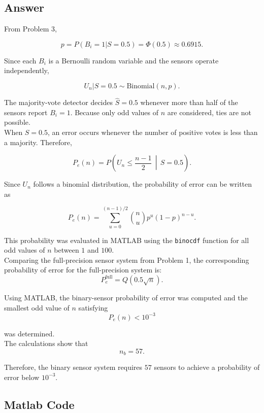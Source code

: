 \documentclass[12pt,a4paper]{article}
\begin{document}
\subsection{Answer}

From Problem 3,

\[
p=P(B_i=1|S=0.5)
=
\Phi(0.5)
\approx 0.6915.
\]

Since each \(B_i\) is a Bernoulli random variable and the sensors operate independently,

\[
U_n|S=0.5
\sim
\text{Binomial}(n,p).
\]

The majority-vote detector decides \(\hat{S}=0.5\) whenever more than half of the sensors report \(B_i=1\). Because only odd values of $n$ are considered, ties are not possible.\\

When \(S=0.5\), an error occurs whenever the number of positive votes is less than a majority. Therefore,

\[
P_e(n)
=
P\!\left(
U_n\leq \frac{n-1}{2}
\,\middle|\,
S=0.5
\right).
\]

Since \(U_n\) follows a binomial distribution, the probability of error can be written as

\[
P_e(n)
=
\sum_{u=0}^{(n-1)/2}
\binom{n}{u}
p^u
(1-p)^{n-u}.
\]

This probability was evaluated in MATLAB using the \texttt{binocdf} function for all odd values of \(n\) between \(1\) and \(100\).\\

Comparing the full-precision sensor system from Problem 1, the corresponding probability of error for the full-precision system is:
\[
P_e^{\text{full}}
=
Q(0.5\sqrt{n}).
\]

Using MATLAB, the binary-sensor probability of error was computed and the smallest odd value of \(n\) satisfying
\[
P_e(n)<10^{-3}
\]

was determined.\\

The calculations show that
\[
\boxed{n_b=57}.
\]

Therefore, the binary sensor system requires \(57\) sensors to achieve a probability of error below \(10^{-3}\).

\subsection{Matlab Code}
\end{document}
